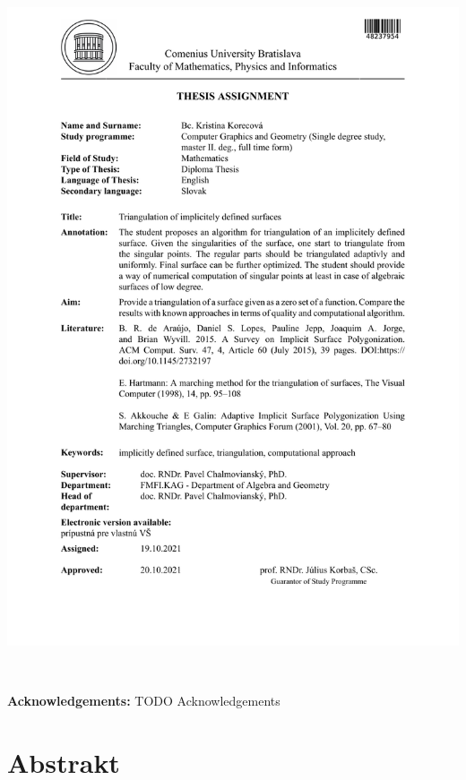 \documentclass[12pt, twoside]{book}
\begin{document}
\hspace{-2cm}\includegraphics[page=2,width=1.1\textwidth]{images/zadanie-en}


\frontmatter

\setcounter{page}{3}
\newpage 
~

\vfill
{\bf Acknowledgements:} TODO Acknowledgements


\newpage 
\section*{Abstrakt}
\end{document}
